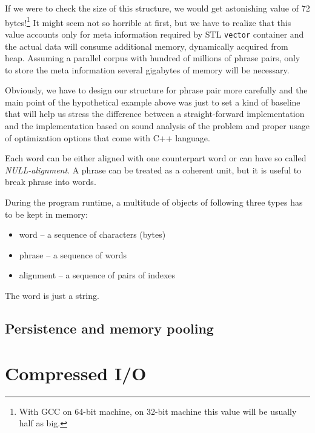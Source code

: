 If we were to check the size of this structure, we would get astonishing value of 72
bytes!\footnote{With GCC on 64-bit machine, on 32-bit machine this value will be usually
half as big.}
It might seem not so horrible at first, but we have to realize that this value accounts only
for meta information required by STL \verb|vector| container and the actual data will consume
additional memory, dynamically acquired from heap.
Assuming a parallel corpus with hundred of millions of phrase pairs, only to store the meta
information several gigabytes of memory will be necessary.

Obviously, we have to design our structure for phrase pair more carefully and
the main point of the hypothetical example above was just to set a kind of baseline that will help us
stress the difference between a straight-forward implementation and the implementation based on sound
analysis of the problem and proper usage of optimization options that come with C++ language.



Each word can be either aligned with one counterpart word or can have so called \emph{NULL-alignment}.
A phrase can be treated as a coherent unit, but it is useful to break phrase into words.


During the program runtime, a multitude of objects of following three types has to be
kept in memory:
\begin{itemize}
  \item word -- a sequence of characters (bytes)
  \item phrase -- a sequence of words
  \item alignment -- a sequence of pairs of indexes
\end{itemize}

The word is just a string.

\subsection{Persistence and memory pooling}


\section{Compressed I/O}

